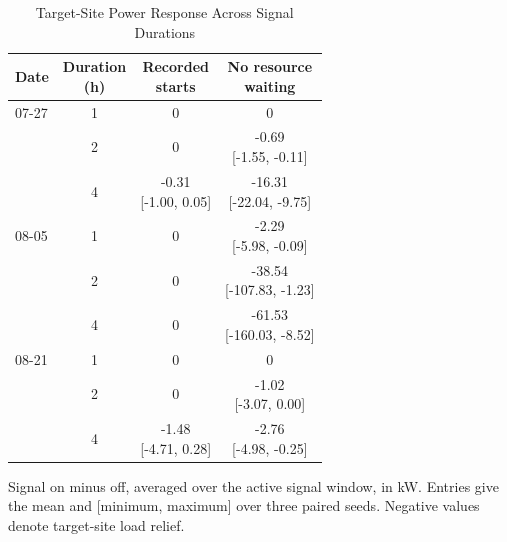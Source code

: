 \begin{table}[!htb]
\color{black}
\caption{Target-Site Power Response Across Signal Durations}
\label{tab:response-replay}
\centering\footnotesize
\setlength{\tabcolsep}{2pt}
\renewcommand{\arraystretch}{1.12}
\begin{tabular*}{\columnwidth}{@{\extracolsep{\fill}}lccc@{}}
\toprule
Date & \shortstack{Duration\\(h)} & \shortstack{Recorded\\starts} & \shortstack{No resource\\waiting}\\
\midrule
07-27 & 1 & 0 & 0\\
 & 2 & 0 & \shortstack{-0.69\\{}[-1.55, -0.11]}\\
 & 4 & \shortstack{-0.31\\{}[-1.00, 0.05]} & \shortstack{-16.31\\{}[-22.04, -9.75]}\\
\midrule
08-05 & 1 & 0 & \shortstack{-2.29\\{}[-5.98, -0.09]}\\
 & 2 & 0 & \shortstack{-38.54\\{}[-107.83, -1.23]}\\
 & 4 & 0 & \shortstack{-61.53\\{}[-160.03, -8.52]}\\
\midrule
08-21 & 1 & 0 & 0\\
 & 2 & 0 & \shortstack{-1.02\\{}[-3.07, 0.00]}\\
 & 4 & \shortstack{-1.48\\{}[-4.71, 0.28]} & \shortstack{-2.76\\{}[-4.98, -0.25]}\\
\bottomrule
\end{tabular*}
\vspace{3pt}
\parbox{\columnwidth}{Signal on minus off, averaged over the active signal window, in kW. Entries give the mean and [minimum, maximum] over three paired seeds. Negative values denote target-site load relief.}
\end{table}
